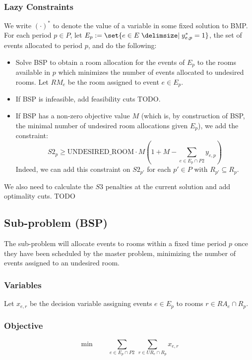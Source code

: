 \documentclass{article}
\theoremstyle{plain}
\numberwithin{theorem}{section}
\numberwithin{example}{section}
\theoremstyle{definition}
\begin{document}
\subsubsection*{Lazy Constraints}
We write $(\cdot)^*$ to denote the value of a variable in some fixed solution to
BMP. For each period $p \in P$, let $E_p := \set{e \in E \given y^*_{e, p} =
1}$, the set of events allocated to period $p$, and do the following:
\begin{itemize}
    \item Solve BSP to obtain a room allocation for the events of $E_p$ to the
        rooms available in $p$ which minimizes the number of events allocated to
        undesired rooms. Let $RM_e$ be the room assigned to event $e \in E_p$.
    \item If BSP is infeasible, add feasibility cuts TODO.
    \item If BSP has a non-zero objective value $M$ (which is, by construction
        of BSP, the minimal number of undesired room allocations given $E_p$),
        we add the constraint:
        \begin{equation}
            S2_p \geq \text{UNDESIRED\_ROOM} \cdot M \left(1 + M -
            \sum_{e \in E_p \cap P2} y_{e, p}\right)
        \end{equation}
        Indeed, we can add this constraint on $S2_{p'}$ for each $p' \in P$ with
        $R_{p'} \subseteq R_p$.
\end{itemize}
We also need to calculate the $S3$ penalties at the current solution and add
optimality cuts. TODO

\subsection{Sub-problem (BSP)} \label{BSP}
The sub-problem will allocate events to rooms within a fixed time period $p$
once they have been scheduled by the master problem, minimizing the number of
events assigned to an undesired room.

\subsubsection*{Variables}
Let $x_{e,r}$ be the decision variable assigning events $e \in E_p$ to rooms $r
\in RA_e \cap R_p$.

\subsubsection*{Objective}
$$
    \min \qquad \sum_{e \in E_p \cap P2} \
        \sum_{r \in UR_e \cap R_p} x_{e,r}
$$
\end{document}
